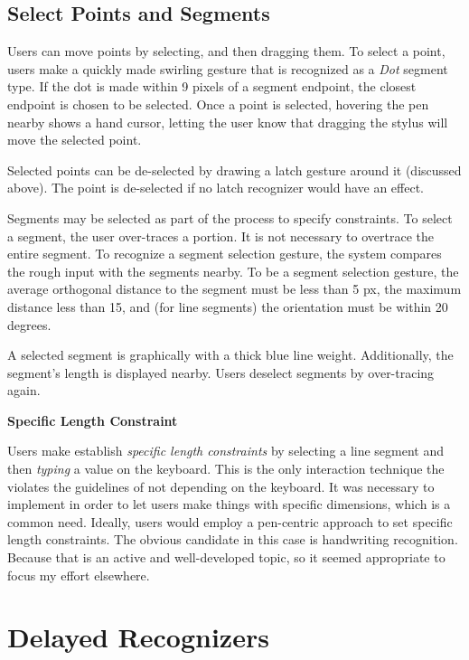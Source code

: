 

\subsection{Select Points and Segments}

Users can move points by selecting, and then dragging them. To select
a point, users make a quickly made swirling gesture that is recognized
as a \textit{Dot} segment type. If the dot is made within 9 pixels of
a segment endpoint, the closest endpoint is chosen to be
selected. Once a point is selected, hovering the pen nearby shows a
hand cursor, letting the user know that dragging the stylus will move
the selected point.

Selected points can be de-selected by drawing a latch gesture around it
(discussed above). The point is de-selected if no latch recognizer
would have an effect.

Segments may be selected as part of the process to specify  constraints. To select a segment, the user over-traces a
portion. It is not necessary to overtrace the entire segment. To
recognize a segment selection gesture, the system compares the rough
input with the segments nearby. To be a segment selection gesture, the
average orthogonal distance to the segment must be less than 5 px, the
maximum distance less than 15, and (for line segments) the orientation
must be within 20 degrees.

A selected segment is graphically with a thick blue line
weight. Additionally, the segment's length is displayed nearby. Users
deselect segments by over-tracing again.

\vspace{16pt}
\textbf{Specific Length Constraint}

Users make establish \textit{specific length constraints} by selecting
a line segment and then \textit{typing} a value on the keyboard. This
is the only interaction technique the violates the guidelines of not
depending on the keyboard. It was necessary to implement in order to
let users make things with specific dimensions, which is a common
need. Ideally, users would employ a pen-centric approach to set
specific length constraints. The obvious candidate in this case is
handwriting recognition. Because that is an active and well-developed
topic, so it seemed appropriate to focus my effort elsewhere.

\section{Delayed Recognizers}

